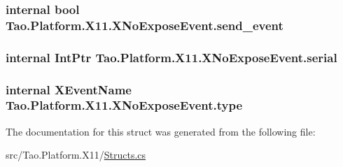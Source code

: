 \label{struct_tao_1_1_platform_1_1_x11_1_1_x_no_expose_event_a4aafa728ba5bec496e2479bf52d6ab95}
\hypertarget{struct_tao_1_1_platform_1_1_x11_1_1_x_no_expose_event_acc38f809e10d559bc0f33dc103504b46}{
\subsubsection[{send\_\-event}]{\setlength{\rightskip}{0pt plus 5cm}internal bool {\bf Tao.Platform.X11.XNoExposeEvent.send\_\-event}}}
\label{struct_tao_1_1_platform_1_1_x11_1_1_x_no_expose_event_acc38f809e10d559bc0f33dc103504b46}
\hypertarget{struct_tao_1_1_platform_1_1_x11_1_1_x_no_expose_event_a3c9a6088bf77089a254525097311eb69}{
\subsubsection[{serial}]{\setlength{\rightskip}{0pt plus 5cm}internal IntPtr {\bf Tao.Platform.X11.XNoExposeEvent.serial}}}
\label{struct_tao_1_1_platform_1_1_x11_1_1_x_no_expose_event_a3c9a6088bf77089a254525097311eb69}
\hypertarget{struct_tao_1_1_platform_1_1_x11_1_1_x_no_expose_event_ada56c9399b1ca7dad19d2a1ba246c026}{
\subsubsection[{type}]{\setlength{\rightskip}{0pt plus 5cm}internal {\bf XEventName} {\bf Tao.Platform.X11.XNoExposeEvent.type}}}
\label{struct_tao_1_1_platform_1_1_x11_1_1_x_no_expose_event_ada56c9399b1ca7dad19d2a1ba246c026}


The documentation for this struct was generated from the following file:\begin{DoxyCompactItemize}
\item 
src/Tao.Platform.X11/\hyperlink{_structs_8cs}{Structs.cs}\end{DoxyCompactItemize}
